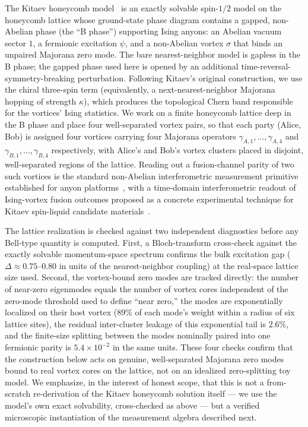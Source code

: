 \documentclass[aps,pra,twocolumn,superscriptaddress,floatfix,nofootinbib]{revtex4-2}
\begin{document}
The Kitaev honeycomb model~\cite{Kitaev2006} is an exactly solvable
spin-$1/2$ model on the honeycomb lattice whose ground-state phase
diagram contains a gapped, non-Abelian phase (the ``B phase'')
supporting Ising anyons: an Abelian vacuum sector $1$, a fermionic
excitation $\psi$, and a non-Abelian vortex $\sigma$ that binds an
unpaired Majorana zero mode. The bare nearest-neighbor model is
gapless in the B phase; the gapped phase used here is opened by
an additional
time-reversal-symmetry-breaking perturbation. Following Kitaev's
original construction, we use the chiral three-spin term
(equivalently, a next-nearest-neighbor Majorana hopping of strength
$\kappa$), which produces the topological Chern band responsible for
the vortices' Ising statistics. We work on a finite honeycomb lattice
deep in the B phase and place four well-separated vortex pairs, so
that each party (Alice, Bob) is assigned four vortices carrying four
Majorana operators $\gamma_{A,1},\ldots,\gamma_{A,4}$ and
$\gamma_{B,1},\ldots,\gamma_{B,4}$ respectively, with Alice's and
Bob's vortex clusters placed in disjoint, well-separated regions of
the lattice. Reading out a fusion-channel parity of two such vortices
is the standard non-Abelian interferometric measurement primitive
established for anyon platforms~\cite{BondersonShtengelSlingerland2008}, with
a time-domain interferometric readout of Ising-vortex fusion outcomes
proposed as a concrete experimental technique for Kitaev
spin-liquid candidate materials~\cite{Klocke2021}.

The lattice realization is checked against two independent
diagnostics before any Bell-type quantity is computed. First, a
Bloch-transform cross-check against the exactly solvable momentum-space
spectrum confirms the bulk excitation gap ($\Delta\approx0.75$--$0.80$
in units of the nearest-neighbor coupling) at the real-space lattice
size used. Second, the vortex-bound zero modes are tracked directly:
the number of near-zero eigenmodes equals the number of vortex cores
independent of the zero-mode threshold used to define ``near
zero,'' the modes are exponentially localized on their host vortex
($89\%$ of each mode's weight within a radius of six lattice
sites), the residual inter-cluster leakage of this exponential tail is
$2.6\%$, and the finite-size splitting between the modes nominally
paired into one fermionic parity is $5.4\times10^{-2}$ in the same
units. These four checks confirm that the construction below acts on
genuine, well-separated Majorana zero modes bound to real vortex
cores on the lattice, not on an idealized zero-splitting toy model. We
emphasize, in the interest of honest scope, that this is not a
from-scratch re-derivation of the Kitaev honeycomb solution itself
--- we use the model's own exact solvability, cross-checked as above
--- but a verified microscopic instantiation of the measurement
algebra described next.
\end{document}
